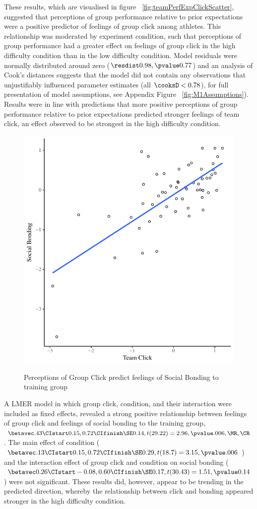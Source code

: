 These results, which are visualised in figure ~\ref{fig:teamPerfExpClickScatter}, suggested that perceptions of group performance relative to prior expectations were a positive predictor of feelings of group click among athletes.  This relationship was moderated by experiment condition, such that perceptions of group performance had a greater effect on feelings of group click in the high difficulty condition than in the low difficulty condition.  Model residuals were normally distributed around zero ($\resdist 0.98, \pvalue 0.77 $) and an analysis of Cook's distances suggests that the model did not contain any observations that unjustifiably influenced parameter estimates (all $\cooksD < 0.78$), for full presentation of model assumptions, see Appendix Figure ~\ref{fig:M1Assumptions}).  Results were in line with predictions that more positive perceptions of group performance relative to prior expectations predicted stronger feelings of team click, an effect observed to be strongest in the high difficulty condition.




\begin{figure}
  \centering
    \includegraphics[width=0.5\linewidth,keepaspectratio] {images/groupClickBondScatter}
    \label{fig:groupClickBondScatter}
    \caption{Perceptions of Group Click predict feelings of Social Bonding to training group}
\end{figure}

A LMER model in which group click, condition, and their interaction were included as fixed effects, revealed a strong positive relationship between feelings of group click and feelings of social bonding to the training group, $\betavec .43 \CIstart 0.15, 0.72 \CIfinish \SE 0.14, t(29.22) = 2.96, \pvalue .006, \MR , \CR $.
The main effect of condition ($\betavec .13 \CIstart 0.15, 0.72 \CIfinish \SE 0.29, t(18.7) = 3.15, \pvalue .006$) and the interaction effect of group click and condition on social bonding ($\betavec 0.26 \CIstart -0.08, 0.60 \CIfinish \SE 0.17, t(30.43) = 1.51, \pvalue 0.14$) were not significant.  These results did, however, appear to be trending in the predicted direction, whereby the relationship between click and bonding appeared stronger in the high difficulty condition.

